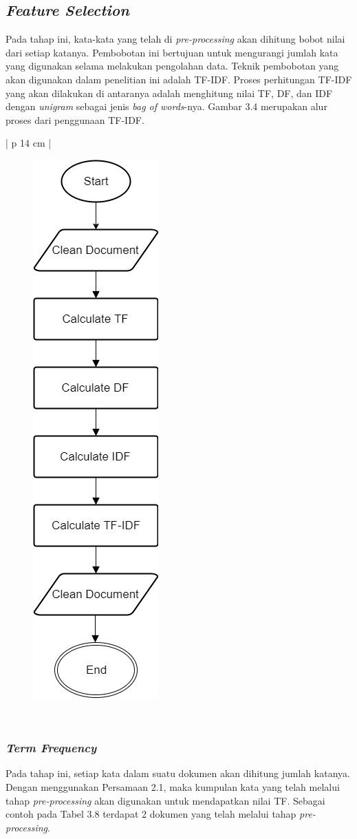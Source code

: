 \subsection{{\itshape Feature Selection}}
\indent
Pada tahap ini, kata-kata yang telah di {\itshape pre-processing} akan dihitung bobot nilai dari setiap katanya. Pembobotan ini bertujuan untuk mengurangi jumlah kata yang digunakan selama melakukan pengolahan data. Teknik pembobotan yang akan digunakan dalam penelitian ini adalah TF-IDF. Proses perhitungan TF-IDF yang akan dilakukan di antaranya adalah menghitung nilai TF, DF, dan IDF dengan {\itshape unigram} sebagai jenis {\itshape bag of words}-nya. Gambar 3.4 merupakan alur proses dari penggunaan TF-IDF.

\begin{table}[H]
\begin{adjustbox}{width=1\textwidth}
\begin{tabular}{| p {14 cm} |}
\hline
\begin{figure}[H]
	\centering
	\includegraphics[width=2 cm]{images/FeatureSelection}
\end{figure}\\
\hline
\end{tabular}
\end{adjustbox}
\end{table}

\subsubsection{{\itshape Term Frequency}}
\indent
Pada tahap ini, setiap kata dalam suatu dokumen akan dihitung jumlah katanya. Dengan menggunakan Persamaan 2.1, maka kumpulan kata yang telah melalui tahap {\itshape pre-processing} akan digunakan untuk mendapatkan nilai TF. Sebagai contoh pada Tabel 3.8 terdapat 2 dokumen yang telah melalui tahap {\itshape pre-processing}.

